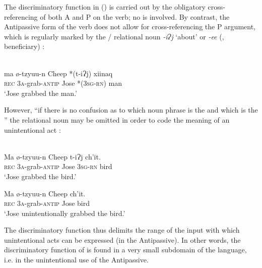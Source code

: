 \documentclass[output=paper]{langsci/langscibook}
\begin{document}
The discriminatory function in  () is carried out by the obligatory cross-referencing of both A and P on the verb; no  is involved. By contrast, the Antipassive form of the verb does not allow for cross-referencing the P argument, which is regularly marked by the  / relational noun \textit{{}-iɁj} ‘about’ or \textit{{}-ee} (, beneficiary) \citep[212]{England1983}:

\ea 
{}\\
\gll ma   ø-tzyuu-n   Cheep   *(t-iɁj)   xiinaq\\
     \textsc{rec}   3\textsc{a}{}-grab-\textsc{antip}   Jose   *(3\textsc{sg}{}-\textsc{rn})   man\\
\glt ‘Jose grabbed the man.’
\z

\noindent However, “if there is no confusion as to which noun phrase is the  and which is the ” the relational noun may be omitted in order to code the meaning of an unintentional act \citep[212]{England1983}:

\ea 
{}\\
\ea
\gll  Ma  ø-tzyuu-n   Cheep   t-iɁj    ch'it. \\
     \textsc{rec} 3\textsc{a}{}-grab-\textsc{antip}   Jose   3\textsc{sg}{}-\textsc{rn} bird\\
\glt ‘Jose grabbed the bird.’

\ex
\gll Ma  ø-tzyuu-n   Cheep   ch'it. \\
     \textsc{rec} 3\textsc{a}{}-grab-\textsc{antip}   Jose   bird\\
\glt ‘Jose unintentionally grabbed the bird.’
\z
\z

\noindent The discriminatory function thus delimits the range of the input with which unintentional acts can be expressed (in the Antipassive). In other words, the discriminatory function of  is found in a very small subdomain of the language, i.e. in the unintentional use of the Antipassive.
\end{document}
